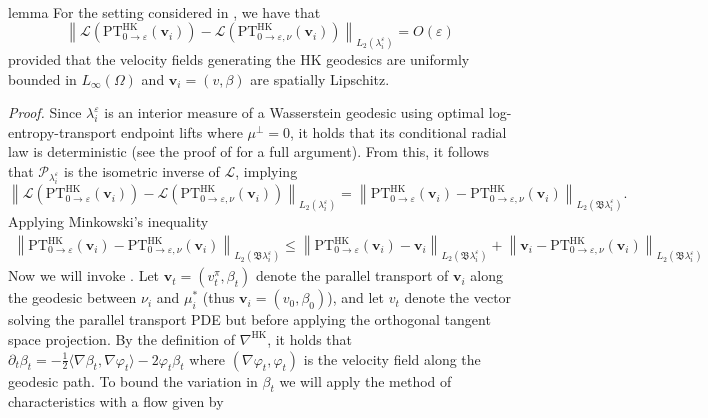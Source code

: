 \documentclass[11pt]{article}
\begin{document}
\\
\begin{restatable}{lemma}{} \label{PT stability}
    For the setting considered in , we have that 
    \[\left\|\mathcal{L}(\text{PT}^{\text{HK}}_{0 \rightarrow \varepsilon}(\mathbf{v}_i)) - \mathcal{L}(\text{PT}^{\text{HK}}_{0\rightarrow \varepsilon, \nu}(\mathbf{v}_i)) \right\|_{L_2(\lambda_i^{\varepsilon})} = O(\varepsilon)\]
    provided that the velocity fields generating the HK geodesics are uniformly bounded in $L_\infty(\Omega)$ and $\mathbf{v}_i = (v, \beta)$ are spatially Lipschitz.
\end{restatable}
\noindent \textit{Proof.} Since $\lambda_i^\varepsilon$ is an interior measure of a Wasserstein geodesic using optimal log-entropy-transport endpoint lifts where $\mu^\perp = 0$, it holds that its conditional radial law is deterministic (see the proof of  for a full argument). From this, it follows that $\mathcal{P}_{\lambda_{i}^\varepsilon}$ is the isometric inverse of $\mathcal{L}$, implying
\[\left\|\mathcal{L}(\text{PT}^{\text{HK}}_{0 \rightarrow \varepsilon}(\mathbf{v}_i)) - \mathcal{L}(\text{PT}^{\text{HK}}_{0\rightarrow \varepsilon, \nu}(\mathbf{v}_i)) \right\|_{L_2(\lambda_i^{\varepsilon})}  = \left\|\text{PT}^{\text{HK}}_{0 \rightarrow \varepsilon}(\mathbf{v}_i) - \text{PT}^{\text{HK}}_{0\rightarrow \varepsilon, \nu}(\mathbf{v}_i) \right\|_{L_2(\mathfrak{B}\lambda_i^{\varepsilon})}. \]
Applying Minkowski's inequality
\begin{align*}
    \left\|\text{PT}^{\text{HK}}_{0 \rightarrow \varepsilon}(\mathbf{v}_i) - \text{PT}^{\text{HK}}_{0\rightarrow \varepsilon, \nu}(\mathbf{v}_i) \right\|_{L_2(\mathfrak{B}\lambda_i^{\varepsilon})} \leq \left\|\text{PT}^{\text{HK}}_{0 \rightarrow \varepsilon}(\mathbf{v}_i) - \mathbf{v}_i \right\|_{L_2(\mathfrak{B}\lambda_i^{\varepsilon})} + \left\|\mathbf{v}_i - \text{PT}^{\text{HK}}_{0\rightarrow \varepsilon, \nu}(\mathbf{v}_i) \right\|_{L_2(\mathfrak{B}\lambda_i^{\varepsilon})}
\end{align*}
Now we will invoke . Let $\mathbf{v}_t = (v_t^\pi, \beta_t)$ denote the parallel transport of $\mathbf{v}_i$ along the geodesic between $\nu_i$ and $\mu_i^*$ (thus $\mathbf{v}_i = (v_0, \beta_0)$), and let $v_t$ denote the vector solving the parallel transport PDE but before applying the orthogonal tangent space projection. By the definition of $\nabla^{\text{HK}}$, it holds that $\partial_t\beta_t = - \frac{1}{2}\langle \nabla \beta_t,\nabla \varphi_t\rangle - 2\varphi_t\beta_t$ where $(\nabla \varphi_t, \varphi_t)$ is the velocity field along the geodesic path. To bound the variation in $\beta_t$ we will apply the method of characteristics with a flow given by 
\end{document}
